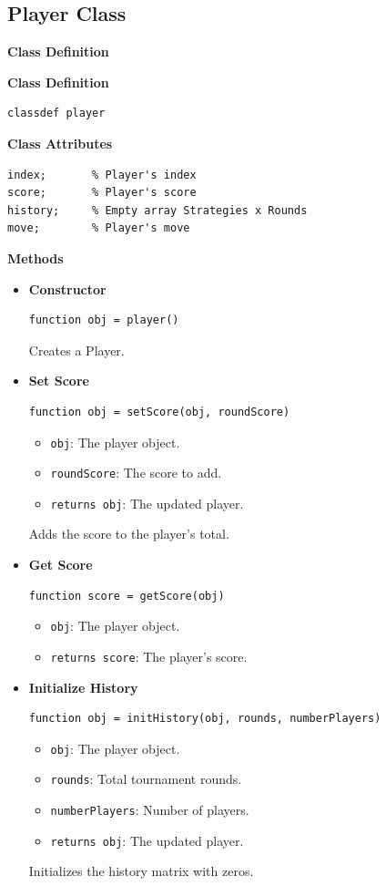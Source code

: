 \documentclass[12pt]{report}
\begin{document}
\subsection{Player Class}

\textbf{Class Definition}


\textbf{Class Definition}
\begin{verbatim}
classdef player 
\end{verbatim}
\textbf{Class Attributes}
\begin{verbatim}
index;       % Player's index
score;       % Player's score
history;     % Empty array Strategies x Rounds
move;        % Player's move
\end{verbatim}
\textbf{Methods}
\begin{itemize}
  \item \textbf{Constructor}
  \begin{verbatim}
function obj = player()
  \end{verbatim}
  Creates a Player.

  \item \textbf{Set Score}
  \begin{verbatim}
function obj = setScore(obj, roundScore)
  \end{verbatim}
  \begin{itemize}
    \item \texttt{obj}: The player object.
    \item \texttt{roundScore}: The score to add.
    \item \texttt{returns obj}: The updated player.
  \end{itemize}
  Adds the score to the player's total.

  \item \textbf{Get Score}
  \begin{verbatim}
function score = getScore(obj)
  \end{verbatim}
  \begin{itemize}
    \item \texttt{obj}: The player object.
    \item \texttt{returns score}: The player's score.
  \end{itemize}

  \item \textbf{Initialize History}
  \begin{verbatim}
function obj = initHistory(obj, rounds, numberPlayers)
  \end{verbatim}
  \begin{itemize}
    \item \texttt{obj}: The player object.
    \item \texttt{rounds}: Total tournament rounds.
    \item \texttt{numberPlayers}: Number of players.
    \item \texttt{returns obj}: The updated player.
  \end{itemize}
  Initializes the history matrix with zeros.


\end{itemize}
\end{document}
